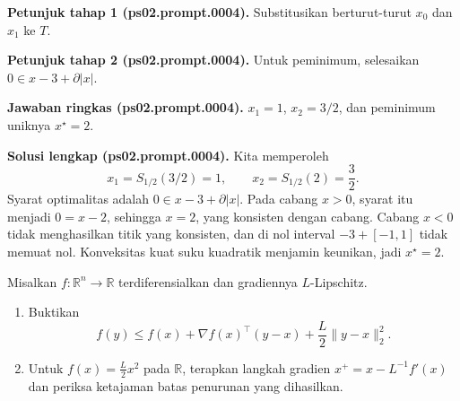 \par\noindent\textbf{Petunjuk tahap 1 (ps02.prompt.0004).}
Substitusikan berturut-turut $x_0$ dan $x_1$ ke $T$.
\label{orig03:ps02:hint1:0004}
\par\noindent\textbf{Petunjuk tahap 2 (ps02.prompt.0004).}
Untuk peminimum, selesaikan $0\in x-3+\partial|x|$.
\label{orig03:ps02:hint2:0004}
\par\noindent\textbf{Jawaban ringkas (ps02.prompt.0004).}
$x_1=1$, $x_2=3/2$, dan peminimum uniknya $x^\star=2$.
\label{orig03:ps02:answer:0004}
\par\noindent\textbf{Solusi lengkap (ps02.prompt.0004).}
Kita memperoleh
\[
 x_1=S_{1/2}(3/2)=1,
 \qquad
 x_2=S_{1/2}(2)=\frac32.
\]
Syarat optimalitas adalah $0\in x-3+\partial|x|$. Pada cabang $x>0$,
syarat itu menjadi $0=x-2$, sehingga $x=2$, yang konsisten dengan cabang.
Cabang $x<0$ tidak menghasilkan titik yang konsisten, dan di nol interval
$-3+[-1,1]$ tidak memuat nol. Konveksitas kuat suku kuadratik menjamin
keunikan, jadi $x^\star=2$.
\label{orig03:ps02:solution:0004}

\begin{exercise}
\label{orig03:ps02:problem:0003}
Misalkan $f:\mathbb{R}^n\to\mathbb{R}$ terdiferensialkan dan gradiennya
$L$-Lipschitz.
\begin{enumerate}
\item\label{orig03:ps02:prompt:0005}
Buktikan
\[
 f(y)\leq f(x)+\nabla f(x)^\top(y-x)+\frac L2\lVert y-x\rVert_2^2.
\]
\item\label{orig03:ps02:prompt:0006}
Untuk $f(x)=\tfrac L2x^2$ pada $\mathbb{R}$, terapkan langkah gradien
$x^+=x-L^{-1}f'(x)$ dan periksa ketajaman batas penurunan yang dihasilkan.
\end{enumerate}
\end{exercise}

